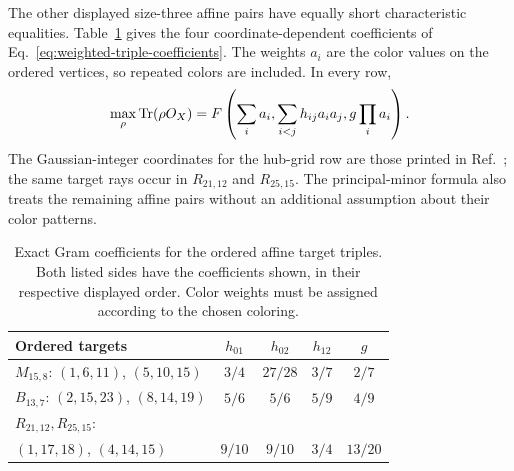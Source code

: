 \documentclass[aps,pra,reprint,superscriptaddress,longbibliography,nofootinbib,floatfix,10pt]{revtex4-2}
\theoremstyle{definition}\newtheorem{definition}[theorem]{Definition}
\theoremstyle{remark}\newtheorem{remark}[theorem]{Remark}
\begin{document}
The other displayed size-three affine pairs have equally short characteristic equalities. Table~\ref{tab:weighted-affine-triples} gives the four coordinate-dependent coefficients of Eq.~\eqref{eq:weighted-triple-coefficients}. The weights $a_i$ are the color values on the ordered vertices, so repeated colors are included. In every row,
\begin{equation}\label{eq:weighted-affine-triple-max}
\max_\rho\operatorname{Tr}(\rho O_X)
=F\left(\sum_i a_i,\sum_{i<j}h_{ij}a_ia_j,g\prod_i a_i\right).
\end{equation}
The Gaussian-integer coordinates for the hub-grid row are those printed in Ref.~\cite[Sec.~IV\,D]{2026-latin-context-matrix}; the same target rays occur in $R_{21,12}$ and $R_{25,15}$. The principal-minor formula also treats the remaining affine pairs without an additional assumption about their color patterns.

\begin{table}[t]
\caption{Exact Gram coefficients for the ordered affine target triples. Both listed sides have the coefficients shown, in their respective displayed order. Color weights must be assigned according to the chosen coloring.}\label{tab:weighted-affine-triples}
\footnotesize\setlength{\tabcolsep}{3pt}
\begin{ruledtabular}
\begin{tabular}{lcccc}
Ordered targets & $h_{01}$ & $h_{02}$ & $h_{12}$ & $g$\\\hline
$M_{15,8}$: $(1,6,11)$, $(5,10,15)$ & $3/4$ & $27/28$ & $3/7$ & $2/7$\\
$B_{13,7}$: $(2,15,23)$, $(8,14,19)$ & $5/6$ & $5/6$ & $5/9$ & $4/9$\\
$R_{21,12},R_{25,15}$: & & & &\\[-2pt]
\quad $(1,17,18)$, $(4,14,15)$ & $9/10$ & $9/10$ & $3/4$ & $13/20$
\end{tabular}
\end{ruledtabular}
\end{table}
\end{document}
